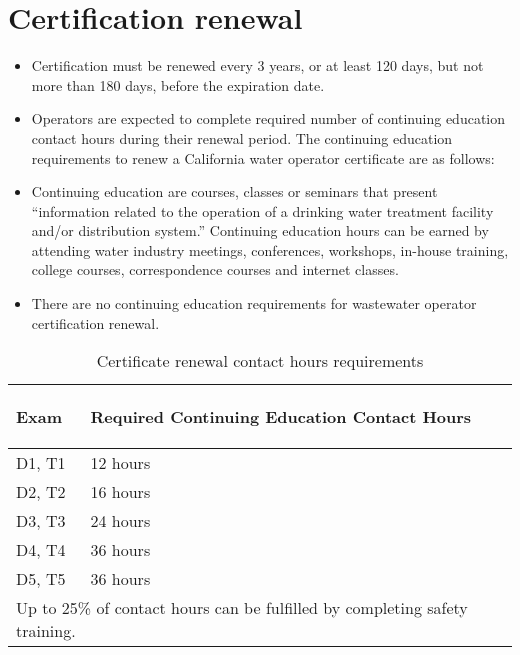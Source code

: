 \section{Certification renewal}
\begin{itemize}
\item Certification must be renewed every 3 years, or at least 120 days, but not more than 180 days, before the expiration date. 
\item Operators are expected to complete required number of continuing education contact hours during their renewal period. The continuing education requirements to renew a California water operator certificate are as follows:  \\
\item Continuing education are courses, classes or seminars that present “information related to the operation of a drinking water treatment facility and/or distribution system.”  Continuing education hours can be earned by attending water industry 
meetings, conferences, workshops, in-­house training, college courses, correspondence 
courses and internet classes.
\item There are no continuing education requirements for wastewater operator certification renewal. 
\end{itemize}
\begin{table}[H]
\begin{center}
\begin{tabular}{|p{2cm}|p{8cm}|}
\hline

\begin{center}{\textbf{Exam}}\end{center} & \begin{center}{\textbf{Required Continuing Education Contact Hours}}\end{center}\\
\hline
D1, T1 & 12 hours\\
\hline
D2, T2 & 16 hours\\
\hline
D3, T3 & 24 hours\\
\hline
D4, T4 & 36 hours\\
\hline
D5, T5 & 36 hours\\
\hline
\multicolumn{2}{|l|}{Up to 25\% of contact hours can be fulfilled by completing safety training.}\\
\hline
\end{tabular}
\caption{Certificate renewal contact hours requirements}
\end{center}
\end{table}
